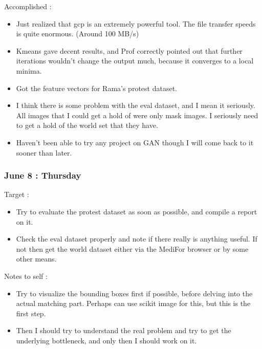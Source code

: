 \documentclass{article}
\begin{document}
Accomplished :
\begin{itemize}
\item Just realized that gcp is an extremely powerful tool. The file transfer speeds is quite enormous. (Around 100 MB/s)
\item Kmeans gave decent results, and Prof correctly pointed out that further iterations wouldn't change the output much, because it converges to a local minima.
\item Got the feature vectors for Rama's protest dataset.
\item I think there is some problem with the eval dataset, and I mean it seriously. All images that I could get a hold of were only mask images. I seriously need to get a hold of the world set that they have.
\item Haven't been able to try any project on GAN though I will come back to it sooner than later.
\end{itemize}

\subsubsection{June 8 : Thursday}
Target :
\begin{itemize}
\item Try to evaluate the protest dataset as soon as possible, and compile a report on it.
\item Check the eval dataset properly and note if there really is anything useful. If not then get the world dataset either via the MediFor browser or by some other means.
\end{itemize}

Notes to self :
\begin{itemize}
\item Try to visualize the bounding boxes first if possible, before delving into the actual matching part. Perhaps can use scikit image for this, but this is the first step.
\item Then I should try to understand the real problem and try to get the underlying bottleneck, and only then I should work on it.
\end{itemize}
\end{document}
